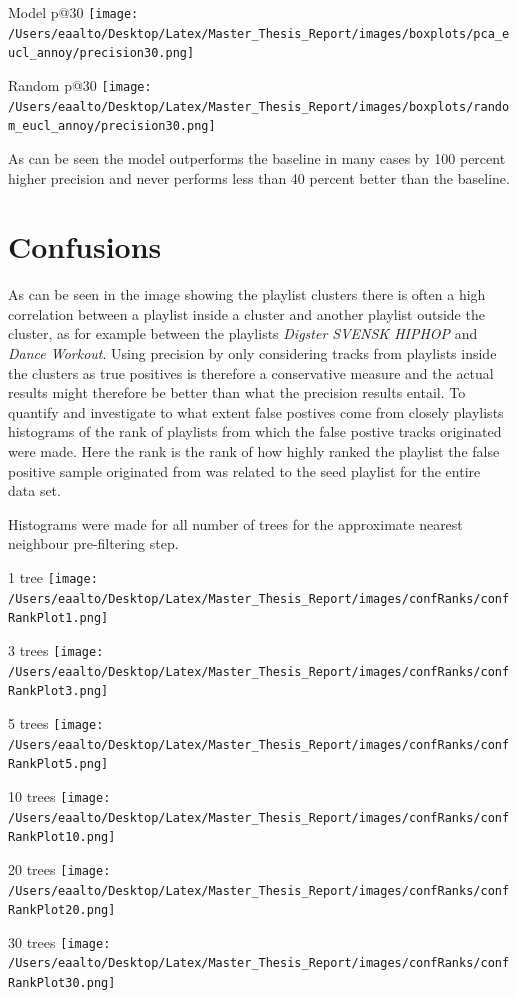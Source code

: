\documentclass[a4paper,11pt]{kth-mag}
\begin{document}
Model p@30
\texttt{[image: /Users/eaalto/Desktop/Latex/Master\_Thesis\_Report/images/boxplots/pca\_eucl\_annoy/precision30.png]}

Random p@30
\texttt{[image: /Users/eaalto/Desktop/Latex/Master\_Thesis\_Report/images/boxplots/random\_eucl\_annoy/precision30.png]}

As can be seen the model outperforms the baseline in many cases by 100 percent higher precision and never performs less than 40 percent better than the baseline.

\section{Confusions}
As can be seen in the image showing the playlist clusters there is often a high correlation between a playlist inside a cluster and another playlist outside the cluster, as for example between the playlists \textit{Digster SVENSK HIPHOP} and \textit{Dance Workout}. Using precision by only considering tracks from playlists inside the clusters as true positives is therefore a conservative measure and the actual results might therefore be better than what the precision results entail. To quantify and investigate to what extent false postives come from closely playlists histograms of the rank of playlists from which the false postive tracks originated were made. Here the rank is the rank of how highly ranked the playlist the false positive sample originated from was related to the seed playlist for the entire data set.

Histograms were made for all number of trees for the approximate nearest neighbour pre-filtering step.

1 tree
\texttt{[image: /Users/eaalto/Desktop/Latex/Master\_Thesis\_Report/images/confRanks/confRankPlot1.png]}

3 trees
\texttt{[image: /Users/eaalto/Desktop/Latex/Master\_Thesis\_Report/images/confRanks/confRankPlot3.png]}

5 trees
\texttt{[image: /Users/eaalto/Desktop/Latex/Master\_Thesis\_Report/images/confRanks/confRankPlot5.png]}

10 trees
\texttt{[image: /Users/eaalto/Desktop/Latex/Master\_Thesis\_Report/images/confRanks/confRankPlot10.png]}

20 trees
\texttt{[image: /Users/eaalto/Desktop/Latex/Master\_Thesis\_Report/images/confRanks/confRankPlot20.png]}

30 trees
\texttt{[image: /Users/eaalto/Desktop/Latex/Master\_Thesis\_Report/images/confRanks/confRankPlot30.png]}
\end{document}
